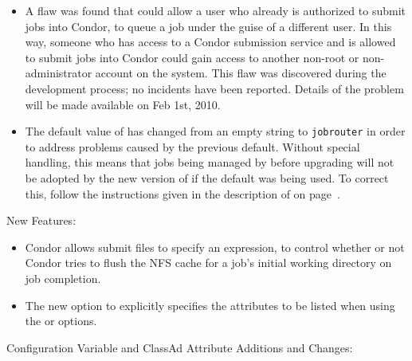\begin{itemize}

\item \Security A flaw was found that could allow a user who already is authorized to
submit jobs into Condor, to queue a job under the guise of  a different
user.  In this way, someone who has access to a Condor submission
service and is allowed to submit jobs into Condor could gain access to
another non-root or non-administrator account on the system.
This flaw was discovered during the development process; no incidents
have been reported.  Details of the problem will be made available on Feb 1st,
2010.

\item The default value of  has changed
  from an empty string to \verb|jobrouter| in order to address
  problems caused by the previous default.  Without special handling,
  this means that jobs being managed by  before
  upgrading will not be adopted by the new version of
   if the default  was
  being used.  To correct this, follow the instructions given in the
  description of  on
  page~\pageref{JobRouterName}.

\end{itemize}


\noindent New Features:

\begin{itemize}

\item Condor allows submit files to specify an 
expression,
to control whether or not Condor tries to flush the NFS cache for 
a job's initial working directory on job completion.

\item The new  option to 
  explicitly specifies the attributes to be listed when using the
   or  options.

\end{itemize}

\noindent Configuration Variable and ClassAd Attribute Additions and Changes:

